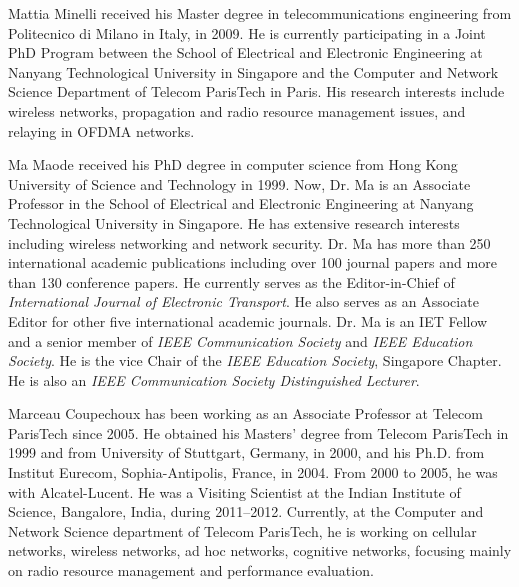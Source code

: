 \documentclass[draftcls,onecolumn]{IEEEtran}
\theoremstyle{plain}
\theoremstyle{definition}
\begin{document}
\begin{IEEEbiography}{Mattia Minelli} received his Master degree in telecommunications
engineering from Politecnico di Milano in Italy, in 2009. He is currently
participating in a Joint PhD Program between the School of
Electrical and Electronic Engineering at Nanyang Technological University
in Singapore and the Computer and Network Science Department
of Telecom ParisTech in Paris. His research interests include
wireless networks, propagation and radio resource management issues,
and relaying in OFDMA networks.
\end{IEEEbiography}

\begin{IEEEbiography}{Ma Maode} received his PhD degree in computer science from Hong Kong University of Science and Technology in 1999. Now, Dr. Ma is an Associate Professor in the School of Electrical and Electronic Engineering at Nanyang Technological University in Singapore. He has extensive research interests including wireless networking and network security. Dr. Ma has more than 250 international academic publications including over 100 journal papers and more than 130 conference papers. He currently serves as the Editor-in-Chief of {\it International Journal of Electronic Transport}. He also serves as an Associate Editor for other five international academic journals. Dr. Ma is an IET Fellow and a senior member of {\it IEEE Communication Society} and {\it IEEE Education Society}. He is the vice Chair of the {\it IEEE Education Society}, Singapore Chapter. He is also an {\it IEEE Communication Society Distinguished Lecturer}.
\end{IEEEbiography}

\vspace{-1.4cm}
\begin{IEEEbiography}{Marceau Coupechoux} has been working as an Associate Professor at Telecom ParisTech since 2005. He obtained his Masters' degree from Telecom ParisTech in 1999 and from University of Stuttgart, Germany, in 2000, and his Ph.D. from Institut Eurecom, Sophia-Antipolis, France, in 2004. From 2000 to 2005, he was with Alcatel-Lucent. He was a Visiting Scientist at the Indian Institute of Science, Bangalore, India, during 2011--2012. Currently, at the Computer and Network Science department of Telecom ParisTech, he is working on cellular networks, wireless networks, ad hoc networks, cognitive networks, focusing mainly on radio resource management and performance evaluation.
\end{IEEEbiography}
\end{document}
